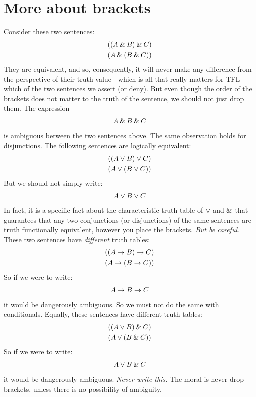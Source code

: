 \section{More about brackets}\label{s:MoreBracketingConventions}
Consider these two sentences:
	\begin{align*}
		((A \mathbin{\&} B) \mathbin{\&} C)\\
		(A \mathbin{\&} (B \mathbin{\&} C))
	\end{align*}
They are equivalent, and so, consequently, it will never make any difference from the perspective of their truth value---which is all that really matters for TFL---which of the two sentences we assert (or deny). But even though the order of the brackets does not matter to the truth of the sentence, we should not just drop them. The expression
	\begin{align*}
		A \mathbin{\&} B \mathbin{\&} C
	\end{align*}
is ambiguous between the two sentences above.  The same observation holds for disjunctions. The following sentences are logically equivalent:
	\begin{align*}
		((A \vee B) \vee C)\\
		(A \vee (B \vee C))
	\end{align*}
But we should not simply write:
	\begin{align*}
		A \vee B \vee C
	\end{align*}
In fact, it is a specific fact about the characteristic truth table of $\vee$ and $\mathbin{\&}$ that guarantees that any two conjunctions (or disjunctions) of the same sentences are truth functionally equivalent, however you place the brackets. \emph{But be careful}. These two sentences have \emph{different} truth tables:
	\begin{align*}
		((A \rightarrow B) \rightarrow C)\\
		(A \rightarrow (B \rightarrow C))
	\end{align*}
So if we were to write:
	\begin{align*}
		A \rightarrow B \rightarrow C
	\end{align*}
it would be dangerously ambiguous. So we must not do the same with conditionals. Equally, these sentences have different truth tables:
	\begin{align*}
		((A \vee B) \mathbin{\&} C)\\
		(A \vee (B \mathbin{\&} C))
	\end{align*}
So if we were to write:
	\begin{align*}
		A \vee B \mathbin{\&} C
	\end{align*}
it would be dangerously ambiguous. \emph{Never write this.} The moral is never drop brackets, unless there is no possibility of ambiguity.


